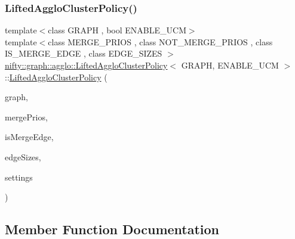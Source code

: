 \mbox{\label{classnifty_1_1graph_1_1agglo_1_1LiftedAggloClusterPolicy_a508b7d1816f45e00752e045a1c342e54}} 
\subsubsection{\texorpdfstring{Lifted\+Agglo\+Cluster\+Policy()}{LiftedAggloClusterPolicy()}\hspace{0.1cm}{\footnotesize\ttfamily [2/2]}}
{\footnotesize\ttfamily template$<$class G\+R\+A\+PH , bool E\+N\+A\+B\+L\+E\+\_\+\+U\+CM$>$ \\
template$<$class M\+E\+R\+G\+E\+\_\+\+P\+R\+I\+OS , class N\+O\+T\+\_\+\+M\+E\+R\+G\+E\+\_\+\+P\+R\+I\+OS , class I\+S\+\_\+\+M\+E\+R\+G\+E\+\_\+\+E\+D\+GE , class E\+D\+G\+E\+\_\+\+S\+I\+Z\+ES $>$ \\
\hyperlink{classnifty_1_1graph_1_1agglo_1_1LiftedAggloClusterPolicy}{nifty\+::graph\+::agglo\+::\+Lifted\+Agglo\+Cluster\+Policy}$<$ G\+R\+A\+PH, E\+N\+A\+B\+L\+E\+\_\+\+U\+CM $>$\+::\hyperlink{classnifty_1_1graph_1_1agglo_1_1LiftedAggloClusterPolicy}{Lifted\+Agglo\+Cluster\+Policy} (\begin{DoxyParamCaption}\item[{const \hyperlink{classnifty_1_1graph_1_1agglo_1_1LiftedAggloClusterPolicy_a727d681b2fa133b8c9b225ab11cd2402}{Graph\+Type} \&}]{graph,  }\item[{const M\+E\+R\+G\+E\+\_\+\+P\+R\+I\+OS \&}]{merge\+Prios,  }\item[{const I\+S\+\_\+\+M\+E\+R\+G\+E\+\_\+\+E\+D\+GE \&}]{is\+Merge\+Edge,  }\item[{const E\+D\+G\+E\+\_\+\+S\+I\+Z\+ES \&}]{edge\+Sizes,  }\item[{const \hyperlink{structnifty_1_1graph_1_1agglo_1_1LiftedAggloClusterPolicy_1_1SettingsType}{Settings\+Type} \&}]{settings }\end{DoxyParamCaption})\hspace{0.3cm}{\ttfamily [inline]}}



\subsection{Member Function Documentation}
\mbox{\label{classnifty_1_1graph_1_1agglo_1_1LiftedAggloClusterPolicy_a75a7a14461450bf423e77eb83b3a5f45}} 
